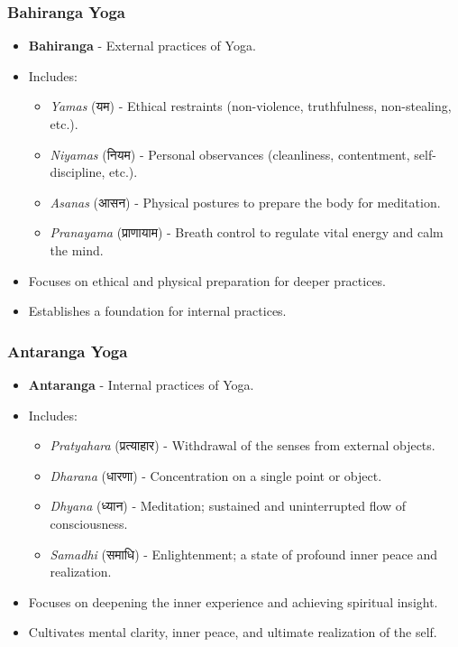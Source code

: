 \begin{frame}[fragile]\frametitle{Bahiranga Yoga}

      \begin{itemize}
		\item \textbf{Bahiranga} - External practices of Yoga.
		\item Includes:
		  \begin{itemize}
		      \item \textit{Yamas} (यम) - Ethical restraints (non-violence, truthfulness, non-stealing, etc.).
		      \item \textit{Niyamas} (नियम) - Personal observances (cleanliness, contentment, self-discipline, etc.).
		      \item \textit{Asanas} (आसन) - Physical postures to prepare the body for meditation.
		      \item \textit{Pranayama} (प्राणायाम) - Breath control to regulate vital energy and calm the mind.
		  \end{itemize}
		\item Focuses on ethical and physical preparation for deeper practices.
		\item Establishes a foundation for internal practices.
	  \end{itemize}

\end{frame}

\begin{frame}[fragile]\frametitle{Antaranga Yoga}

      \begin{itemize}
		\item \textbf{Antaranga} - Internal practices of Yoga.
		\item Includes:
		  \begin{itemize}
		      \item \textit{Pratyahara} (प्रत्याहार) - Withdrawal of the senses from external objects.
		      \item \textit{Dharana} (धारणा) - Concentration on a single point or object.
		      \item \textit{Dhyana} (ध्यान) - Meditation; sustained and uninterrupted flow of consciousness.
		      \item \textit{Samadhi} (समाधि) - Enlightenment; a state of profound inner peace and realization.
		  \end{itemize}
		\item Focuses on deepening the inner experience and achieving spiritual insight.
		\item Cultivates mental clarity, inner peace, and ultimate realization of the self.
	  \end{itemize}

\end{frame}

